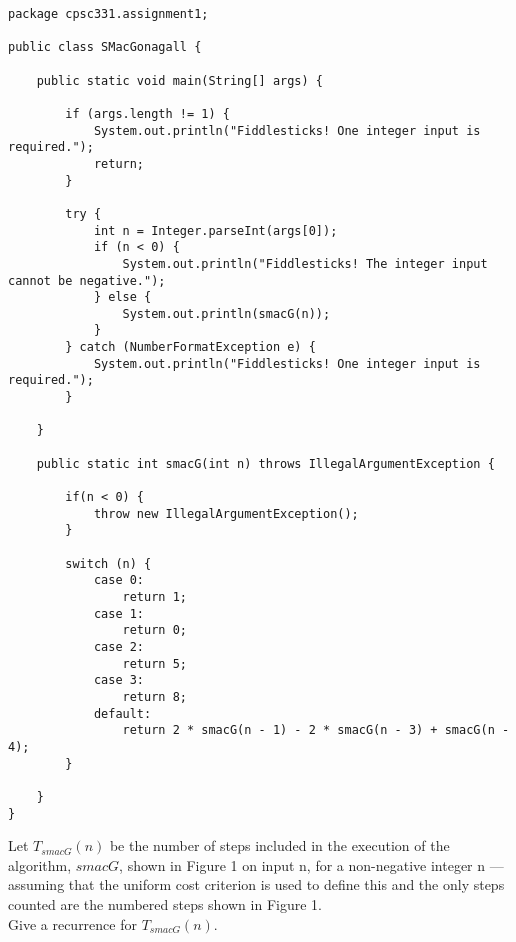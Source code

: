 \documentclass[12pt]{article}
\newenvironment{problem}[2][Problem]{\begin{trivlist}
\item[\hskip \labelsep {\bfseries #1}\hskip \labelsep {\bfseries #2.}]}{\end{trivlist}}
\begin{document}
\begin{problem}{3} $\:$
\begin{Verbatim}[fontsize=\small]
package cpsc331.assignment1;

public class SMacGonagall {

    public static void main(String[] args) {

        if (args.length != 1) {
            System.out.println("Fiddlesticks! One integer input is required.");
            return;
        }

        try {
            int n = Integer.parseInt(args[0]);
            if (n < 0) {
                System.out.println("Fiddlesticks! The integer input cannot be negative.");
            } else {
                System.out.println(smacG(n));
            }
        } catch (NumberFormatException e) {
            System.out.println("Fiddlesticks! One integer input is required.");
        }

    }

    public static int smacG(int n) throws IllegalArgumentException {

        if(n < 0) {
            throw new IllegalArgumentException();
        }

        switch (n) {
            case 0:
                return 1;
            case 1:
                return 0;
            case 2:
                return 5;
            case 3:
                return 8;
            default:
                return 2 * smacG(n - 1) - 2 * smacG(n - 3) + smacG(n - 4);
        }

    }
}
\end{Verbatim}
\end{problem}





\begin{problem}{4}
Let $T_{smacG}(n)$ be the number of steps included in the execution of the algorithm, $smacG$,
shown in Figure 1 on input n, for a non-negative integer n — assuming that the uniform
cost criterion is used to define this and the only steps counted are the numbered steps
shown in Figure 1.
\\
Give a recurrence for $T_{smacG}(n)$.
\end{problem}
\end{document}
